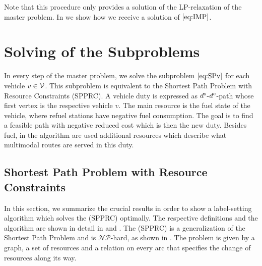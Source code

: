 Note that this procedure only provides a solution of the LP-relaxation of the master problem. In  we show how we receive a solution of $\eqref{eq:IMP}$.


\section{Solving of the Subproblems}
\label{sec:solving_subproblem}

In every step of the master problem, we solve the subproblem $\eqref{eq:SPv}$ for each vehicle $v\in\mathcal{V}$. This subproblem is equivalent to the Shortest Path Problem with Resource Constraints (SPPRC). A vehicle duty is expressed as $d^{\operatorname{s}}$-$d^{\operatorname{e}}$-path whose first vertex is the respective vehicle $v$. The main resource is the fuel state of the vehicle, where refuel stations have negative fuel consumption. The goal is to find a feasible path with negative reduced cost which is then the new duty. Besides fuel, in the algorithm are used additional resources which describe what multimodal routes are served in this duty.

\subsection{Shortest Path Problem with Resource Constraints}

In this section, we summarize the crucial results in order to show a label-setting algorithm which solves the (SPPRC) optimally. The respective definitions and the algorithm are shown in detail in \cite{Kaiser} and \cite{Irnich_Desaulniers}. The (SPPRC) is a generalization of the Shortest Path Problem and is $\mathcal{NP}$-hard, as shown in \cite[p.307]{Handler_Zang}. The problem is given by a graph, a set of resources and a relation on every arc that specifies the change of resources along its way. 

